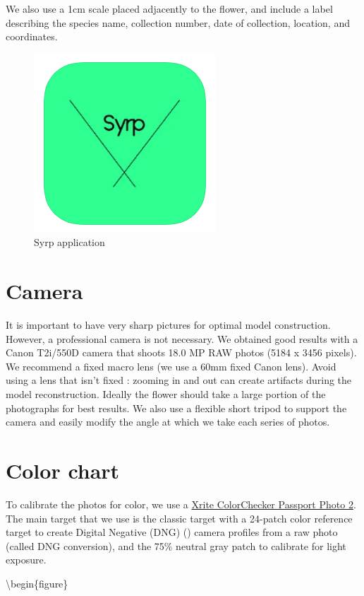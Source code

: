 \documentclass[
]{book}
\begin{document}
We also use a 1cm scale placed adjacently to the flower, and include a label describing the species name, collection number, date of collection, location, and coordinates.

\begin{figure}

{\centering \includegraphics[width=0.2\linewidth]{Figures/Syrp_app} 

}

\caption{Syrp application}\label{fig:Syrp}
\end{figure}

\hypertarget{camera}{%
\section{Camera}\label{camera}}

It is important to have very sharp pictures for optimal model
construction. However, a professional camera is not necessary. We
obtained good results with a Canon T2i/550D camera that shoots 18.0 MP
RAW photos (5184 x 3456 pixels). We recommend a fixed macro lens (we use
a 60mm fixed Canon lens). Avoid using a lens that isn't fixed : zooming
in and out can create artifacts during the model reconstruction. Ideally
the flower should take a large portion of the photographs for best
results. We also use a flexible short tripod to support the camera and
easily modify the angle at which we take each series of photos.

\hypertarget{color-chart}{%
\section{Color chart}\label{color-chart}}

To calibrate the photos for color, we use a \href{https://www.xrite.com/categories/calibration-profiling/colorchecker-classic-family/colorchecker-passport-photo-2}{Xrite ColorChecker Passport
Photo
2}.
The main target that we use is the classic target with a 24-patch color
reference target to create Digital Negative (DNG) (\citet{Adobe2012DNG}) camera
profiles from a raw photo (called DNG conversion), and the 75\% neutral
gray patch to calibrate for light exposure.

\textbackslash begin\{figure\}
\end{document}
